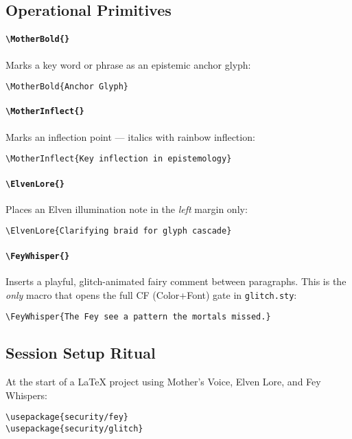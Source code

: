 \subsection*{Operational Primitives}

\paragraph{\texttt{\textbackslash MotherBold\{\}}}
Marks a key word or phrase as an epistemic anchor glyph:
\begin{verbatim}
\MotherBold{Anchor Glyph}
\end{verbatim}

\paragraph{\texttt{\textbackslash MotherInflect\{\}}}
Marks an inflection point — italics with rainbow inflection:
\begin{verbatim}
\MotherInflect{Key inflection in epistemology}
\end{verbatim}

\paragraph{\texttt{\textbackslash ElvenLore\{\}}}
Places an Elven illumination note in the \emph{left} margin only:
\begin{verbatim}
\ElvenLore{Clarifying braid for glyph cascade}
\end{verbatim}

\paragraph{\texttt{\textbackslash FeyWhisper\{\}}}
Inserts a playful, glitch-animated fairy comment between paragraphs.  
This is the \emph{only} macro that opens the full CF (Color+Font) gate in \texttt{glitch.sty}:
\begin{verbatim}
\FeyWhisper{The Fey see a pattern the mortals missed.}
\end{verbatim}

\subsection*{Session Setup Ritual}
At the start of a \LaTeX{} project using Mother’s Voice, Elven Lore, and Fey Whispers:
\begin{verbatim}
\usepackage{security/fey}
\usepackage{security/glitch}
\end{verbatim}


